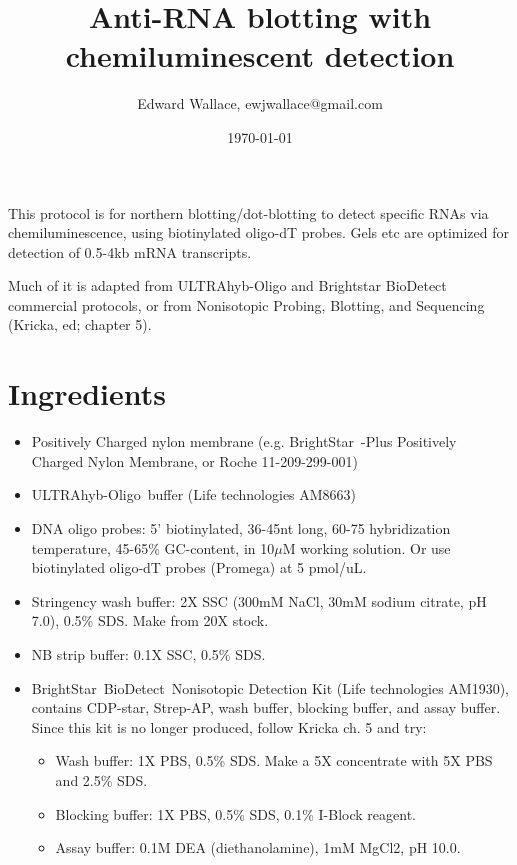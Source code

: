 \documentclass{article}
\newcommand{\muM}{\ensuremath{\mu}M\xspace}
\newcommand{\degC}{\celsius\xspace}
\begin{document}
\title{\vspace{-.75in} Anti-RNA blotting with chemiluminescent detection}
\author{Edward Wallace, ewjwallace@gmail.com}
\date{\today}
\maketitle


This protocol is for northern blotting/dot-blotting to detect specific RNAs via chemiluminescence, using biotinylated oligo-dT probes.
Gels etc are optimized for detection of 0.5-4kb mRNA transcripts.

Much of it is adapted from ULTRAhyb-Oligo and Brightstar BioDetect commercial protocols, or from Nonisotopic Probing, Blotting, and Sequencing (Kricka, ed; chapter 5).

\section*{Ingredients}

\begin{itemize}

  \item Positively Charged nylon membrane (e.g. BrightStar\texttrademark\ -Plus Positively Charged Nylon Membrane, or Roche 11-209-299-001)
\item ULTRAhyb-Oligo\textregistered\ buffer (Life technologies AM8663)
\item DNA oligo probes: 5' biotinylated, 36-45nt long, 60-75\degC hybridization temperature, 45-65\% GC-content, in 10\muM working solution. Or use biotinylated oligo-dT probes (Promega) at 5 pmol/uL.
\item Stringency wash buffer: 2X SSC (300mM NaCl, 30mM sodium citrate, pH 7.0), 0.5\% SDS. Make from 20X stock.
\item NB strip buffer: 0.1X SSC, 0.5\% SDS.
  \item BrightStar\textregistered\ BioDetect\texttrademark\ Nonisotopic Detection Kit (Life technologies AM1930), contains CDP-star, Strep-AP, wash buffer, blocking buffer, and assay buffer. Since this kit is no longer produced, follow Kricka ch. 5 and try:
  \begin{itemize}
  \item Wash buffer: 1X PBS, 0.5\% SDS. Make a 5X concentrate with 5X PBS and 2.5\% SDS.
  \item Blocking buffer: 1X PBS, 0.5\% SDS, 0.1\% I-Block reagent.
  \item Assay buffer: 0.1M DEA (diethanolamine), 1mM MgCl2, pH 10.0. %
\end{itemize}
  
\end{itemize}
\end{document}
